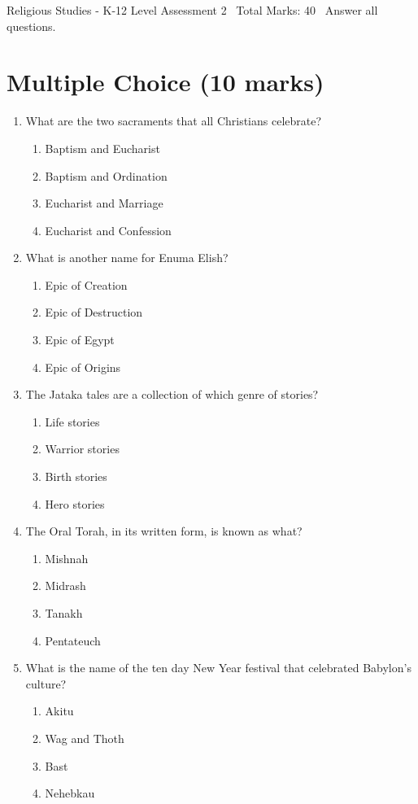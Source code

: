 \documentclass[12pt]{article}
\begin{document}
\begin{center}
Religious Studies - K-12 Level Assessment 2 \
Total Marks: 40 \
Answer all questions.
\end{center}

\section*{Multiple Choice (10 marks)}
\begin{enumerate}[label=\arabic*.]
\item What are the two sacraments that all Christians celebrate?
\begin{enumerate}[label=(\alph*)]
    \item Baptism and Eucharist
    \item Baptism and Ordination
    \item Eucharist and Marriage
    \item Eucharist and Confession
\end{enumerate}
\item What is another name for Enuma Elish?
\begin{enumerate}[label=(\alph*)]
    \item Epic of Creation
    \item Epic of Destruction
    \item Epic of Egypt
    \item Epic of Origins
\end{enumerate}
\item The Jataka tales are a collection of which genre of stories?
\begin{enumerate}[label=(\alph*)]
    \item Life stories
    \item Warrior stories
    \item Birth stories
    \item Hero stories
\end{enumerate}
\item The Oral Torah, in its written form, is known as what?
\begin{enumerate}[label=(\alph*)]
    \item Mishnah
    \item Midrash
    \item Tanakh
    \item Pentateuch
\end{enumerate}
\item What is the name of the ten day New Year festival that celebrated Babylon's culture?
\begin{enumerate}[label=(\alph*)]
    \item Akitu
    \item Wag and Thoth
    \item Bast
    \item Nehebkau
\end{enumerate}
\end{enumerate}
\end{document}
